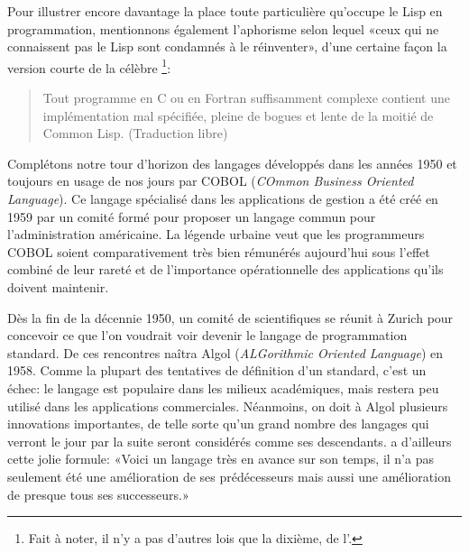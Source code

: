 Pour illustrer encore davantage la place toute particulière qu'occupe
le Lisp en programmation, mentionnons également l'aphorisme selon
lequel «ceux qui ne connaissent pas le Lisp sont condamnés à le
réinventer», d'une certaine façon la version courte de la célèbre
\footnote{%
  Fait à noter, il n'y a pas d'autres lois que la dixième, de
  l'.}: %
\begin{quote}
  Tout programme en C ou en Fortran suffisamment complexe contient
  une implémentation mal spécifiée, pleine de bogues et lente de la
  moitié de Common Lisp. (Traduction libre)
\end{quote}

Complétons notre tour d'horizon des langages développés dans les
années 1950 et toujours en usage de nos jours par COBOL (\emph{COmmon
  Business Oriented Language}). Ce langage spécialisé dans les
applications de gestion a été créé en 1959 par un comité formé pour
proposer un langage commun pour l'administration américaine. La
légende urbaine veut que les programmeurs COBOL soient comparativement
très bien rémunérés aujourd'hui sous l'effet combiné de leur rareté et
de l'importance opérationnelle des applications qu'ils doivent
maintenir.

Dès la fin de la décennie 1950, un comité de scientifiques se réunit à
Zurich pour concevoir ce que l'on voudrait voir devenir le langage de
programmation standard. De ces rencontres naîtra Algol
(\emph{ALGorithmic Oriented Language}) en 1958. Comme la plupart des
tentatives de définition d'un standard, c'est un échec: le langage est
populaire dans les milieux académiques, mais restera peu utilisé dans
les applications commerciales. Néanmoins, on doit à Algol plusieurs
innovations importantes, de telle sorte qu'un grand nombre des
langages qui verront le jour par la suite seront considérés comme ses
descendants. \citet{Hoare:1973} a d'ailleurs cette jolie formule:
«Voici un langage très en avance sur son temps, il n'a pas seulement
été une amélioration de ses prédécesseurs mais aussi une amélioration
de presque tous ses successeurs.»

